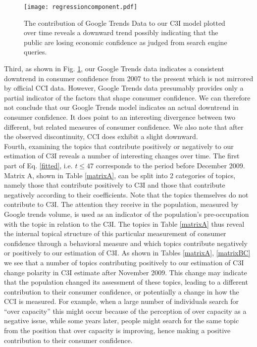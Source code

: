 \documentclass[10pt]{article}
\begin{document}
 	\begin{figure}[h!]
	\begin{center}
                \texttt{[image: regressioncomponent.pdf]}
\caption{ \label{regressionComponent}  The contribution of Google Trends Data to our C3I model plotted over time reveals a downward trend possibly indicating that the public are losing economic confidence as judged from search engine queries.}
	\end{center}
	\end{figure}


Third, as shown in Fig. \ref{regressionComponent}, our Google Trends data indicates a consistent downtrend in consumer confidence from 2007 to the present which is not mirrored by official CCI data. However, Google Trends data presumably provides only a partial indicator of the factors that shape consumer confidence. We can therefore not conclude that our Google Trends model indicates an actual downtrend in consumer confidence. It does point to an interesting divergence between two different, but related measures of consumer confidence. We also note that after the observed discontinuity, CCI does exhibit a slight downward.\\

Fourth, examining the topics that contribute positively or negatively to our estimation of C3I reveals a number of interesting changes over time.
The first part of Eq. \ref{fitted}, i.e. $t\leq47$ corresponds to the period before December 2009. Matrix A, shown in Table \ref{matrixA}, can be split into 2 categories of topics, namely those that contribute positively to C3I and those that contribute negatively according to their coefficients. Note that the topics themselves do not contribute to C3I. The attention they receive in the population, measured by Google trends volume, is used as an indicator of the population's pre-occupation with the topic in relation to the C3I. The topics in Table \ref{matrixA} thus reveal the internal topical structure of this particular measurement of consumer confidence through a behavioral measure and which topics contribute negatively or positively to our estimation of C3I. As shown in Tables \ref{matrixA}, \ref{matrixBC} we see that a number of topics contributing positively to our estimation of C3I change polarity in C3I estimate after November 2009. This change may indicate that the population changed its assessment of these topics, leading to a different contribution to their consumer confidence, or potentially a change in how the CCI is measured. For example, when a large number of individuals search for ``over capacity'' this might occur because of the perception of over capacity as a negative issue, while some years later, people might search for the same topic from the position that over capacity is improving,  hence making a positive contribution to their consumer confidence. \\
\end{document}
